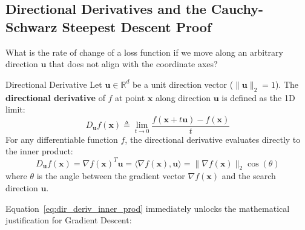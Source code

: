 \subsection{Directional Derivatives and the Cauchy-Schwarz Steepest Descent Proof}
What is the rate of change of a loss function if we move along an arbitrary direction $\mathbf{u}$ that does not align with the coordinate axes?

\begin{definitionbox}{Directional Derivative}
Let $\mathbf{u} \in \mathbb{R}^d$ be a unit direction vector ($\|\mathbf{u}\|_2 = 1$). The \textbf{directional derivative} of $f$ at point $\mathbf{x}$ along direction $\mathbf{u}$ is defined as the 1D limit:
\begin{equation}
D_{\mathbf{u}} f(\mathbf{x}) \triangleq \lim_{t \to 0} \frac{f(\mathbf{x} + t\mathbf{u}) - f(\mathbf{x})}{t}
\label{eq:dir_deriv_def}
\end{equation}
For any differentiable function $f$, the directional derivative evaluates directly to the inner product:
\begin{equation}
D_{\mathbf{u}} f(\mathbf{x}) = \nabla f(\mathbf{x})^T \mathbf{u} = \langle \nabla f(\mathbf{x}), \mathbf{u} \rangle = \|\nabla f(\mathbf{x})\|_2 \cos(\theta)
\label{eq:dir_deriv_inner_prod}
\end{equation}
where $\theta$ is the angle between the gradient vector $\nabla f(\mathbf{x})$ and the search direction $\mathbf{u}$.
\end{definitionbox}

Equation~\eqref{eq:dir_deriv_inner_prod} immediately unlocks the mathematical justification for Gradient Descent:

